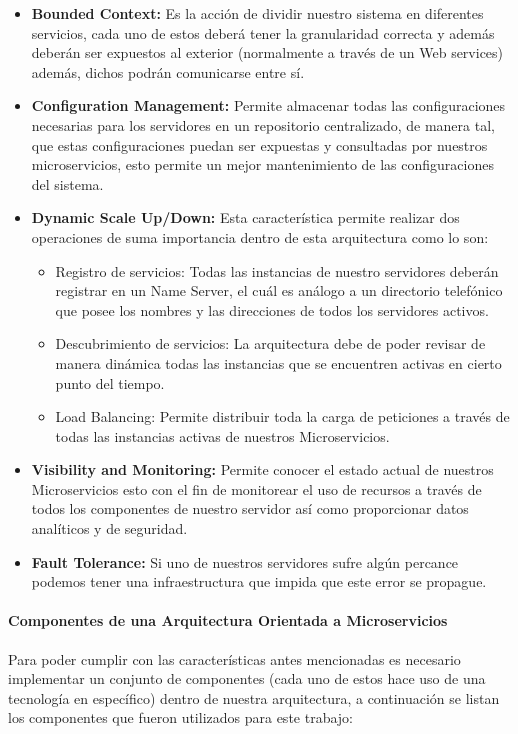 \begin{itemize}
	\item \textbf{Bounded Context:} Es la acción de dividir nuestro sistema en diferentes servicios, cada uno de estos deberá tener la granularidad correcta y además deberán ser expuestos al exterior (normalmente a través de un Web services) además, dichos podrán comunicarse entre sí.
	\item \textbf{Configuration Management:} Permite almacenar todas las configuraciones necesarias para los servidores en un repositorio centralizado, de manera tal, que estas configuraciones puedan ser expuestas y consultadas por nuestros microservicios, esto permite un mejor mantenimiento de las configuraciones del sistema.
	\item \textbf{Dynamic Scale Up/Down:} Esta característica permite realizar dos operaciones de suma importancia dentro de esta arquitectura como lo son:
	\begin{itemize}
		\item Registro de servicios: Todas las instancias de nuestro servidores deberán registrar en un Name Server, el cuál es análogo a un directorio telefónico que posee los nombres y las direcciones de todos los servidores activos.
		\item Descubrimiento de servicios: La arquitectura debe de poder revisar de manera dinámica todas las instancias que se encuentren activas en cierto punto del tiempo.
		\item Load Balancing: Permite distribuir toda la carga de peticiones a través de todas las instancias activas de nuestros Microservicios.
	\end{itemize}
	\item \textbf{Visibility and Monitoring:} Permite conocer el estado actual de nuestros Microservicios esto con el fin de monitorear el uso de recursos a través de todos los componentes de nuestro servidor así como proporcionar datos analíticos y de seguridad.
	\item \textbf{Fault Tolerance:} Si uno de nuestros servidores sufre algún percance podemos tener una infraestructura que impida que este error se propague.
\end{itemize}


\paragraph{Componentes de una Arquitectura Orientada a Microservicios}
Para poder cumplir con las características antes mencionadas es necesario implementar un conjunto de componentes (cada uno de estos hace uso de una tecnología en específico) dentro de nuestra arquitectura, a continuación se listan los componentes que fueron utilizados para este trabajo:

